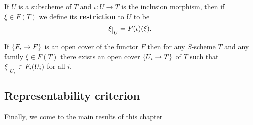 \begin{definition}
If $U$ is a subscheme of $T$ and $\iota:U\to T$ is the inclusion morphism, then if $\xi\in F(T)$ we define its \textbf{restriction} to $U$ to be
\[\xi\res U=F(\iota)(\xi).\]
\end{definition}

\begin{remark}
If $\left\{{F_i\to F}\right\}$ is an open cover of the functor $F$ then for any $S$-scheme $T$ and any family $\xi\in F(T)$ there exists an open cover $\left\{{U_i\to T}\right\}$ of $T$ such that $\xi\res{U_i}\in F_i(U_i)$ for all $i$.
\end{remark}

\subsection{Representability criterion}
Finally, we come to the main results of this chapter

